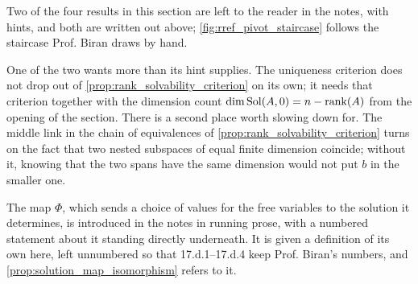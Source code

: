 \begin{ainote}
Two of the four results in this section are left to the reader in the notes,
with hints, and both are written out above; \cref{fig:rref_pivot_staircase}
follows the staircase Prof. Biran draws by hand.

One of the two wants more than its hint supplies. The uniqueness criterion does
not drop out of \cref{prop:rank_solvability_criterion} on its own; it needs that
criterion together with the dimension count $\dim \operatorname{Sol}(A, 0) = n - \operatorname{rank}(A)$
from the opening of the section. There is a second place worth slowing down for.
The middle link in the chain of equivalences of
\cref{prop:rank_solvability_criterion} turns on the fact that two nested
subspaces of equal finite dimension coincide; without it, knowing that the two
spans have the same dimension would not put $b$ in the smaller one.

The map $\Phi$, which sends a choice of values for the free variables to the
solution it determines, is introduced in the notes in running prose, with a
numbered statement about it standing directly underneath. It is given a
definition of its own here, left unnumbered so that 17.d.1--17.d.4 keep Prof.
Biran's numbers, and \cref{prop:solution_map_isomorphism} refers to it.
\end{ainote}

